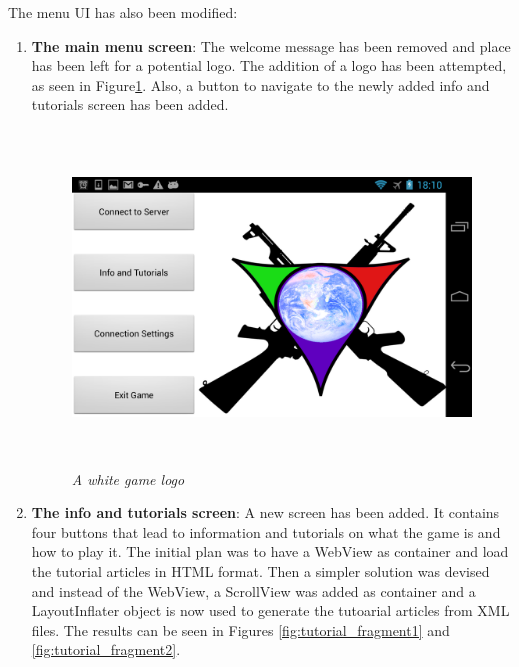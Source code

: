 The menu UI has also been modified:
\begin{enumerate}
  \item \textbf{The main menu screen}: The welcome message has been removed and
  place has been left for a potential logo. The addition of a logo has been
  attempted, as seen in Figure\ref{fig:logo_white}. Also, a button to navigate
  to the newly added info and tutorials screen has been added.
  
  \begin{figure}
  \includegraphics[height=3.5in,width=6.23in]{./images/android_screenshots/logo_white.png}
  \caption{\small \sl A white game logo \label{fig:logo_white}}
  \end{figure}
  
  \item \textbf{The info and tutorials screen}: A new screen has been added.
  It contains four buttons that lead to information and tutorials on what the
  game is and how to play it. The initial plan was to have a WebView as
  container and load the tutorial articles in HTML format. Then a simpler
  solution was devised and instead of the WebView, a ScrollView was added as
  container and a LayoutInflater object is now used to generate the
  tutoarial articles from XML files. The results can be seen in Figures
  \ref{fig:tutorial_fragment1} and \ref{fig:tutorial_fragment2}.
  

\end{enumerate}
